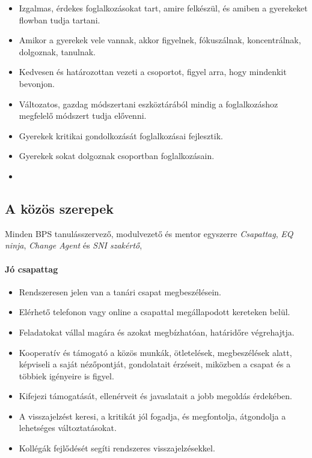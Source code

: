 \begin{itemize}

  \item
        Izgalmas, érdekes foglalkozásokat tart, amire felkészül, és amiben a
        gyerekeket flowban tudja tartani.
  \item
        Amikor a gyerekek vele vannak, akkor figyelnek, fókuszálnak,
        koncentrálnak, dolgoznak, tanulnak.
  \item
        Kedvesen és határozottan vezeti a csoportot, figyel arra, hogy
        mindenkit bevonjon.
  \item Változatos, gazdag módszertani eszköztárából mindig a foglalkozáshoz
        megfelelő módszert tudja elővenni.
  \item  Gyerekek kritikai gondolkozását foglalkozásai fejlesztik.
  \item Gyerekek sokat dolgoznak csoportban foglalkozásain.
  \item
\end{itemize}


\subsection{A közös szerepek}

Minden BPS tanulásszervező, modulvezető és mentor egyszerre  \emph{Csapattag}, \emph{EQ ninja}, \emph{Change Agent} és \emph{SNI szakértő}, 

\paragraph{Jó csapattag}

\begin{itemize}

  \item
        Rendszeresen jelen van a tanári csapat megbeszélésein.
  \item
        Elérhető telefonon vagy online a csapattal megállapodott kereteken
        belül.
  \item
        Feladatokat vállal magára és azokat megbízhatóan, határidőre
        végrehajtja.
  \item
        Kooperatív és támogató a közös munkák, ötletelések, megbeszélések
        alatt, képviseli a saját nézőpontját, gondolatait érzéseit, miközben a
        csapat és a többiek igényeire is figyel.
  \item
        Kifejezi támogatását, ellenérveit és javaslatait a jobb megoldás
        érdekében.
  \item
        A visszajelzést keresi, a kritikát jól fogadja, és megfontolja,
        átgondolja a lehetséges változtatásokat.
  \item
        Kollégák fejlődését segíti rendszeres visszajelzésekkel.
\end{itemize}

